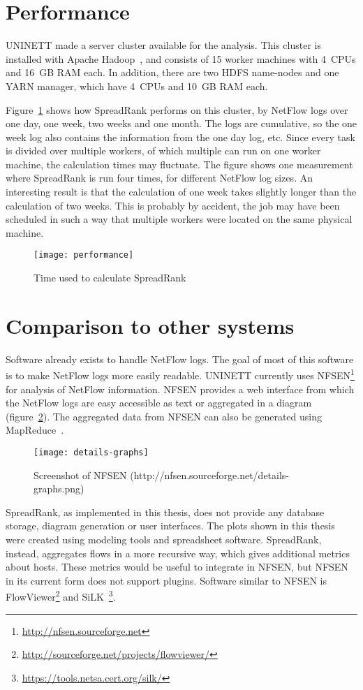 \section{Performance}
UNINETT made a server cluster available for the analysis.
This cluster is installed with Apache Hadoop~\cite{Borthakur:2011:AHG:1989323.1989438}, and consists of 15 worker machines with 4~CPUs and 16~GB RAM each.
In addition, there are two HDFS name-nodes and one YARN manager, which have 4~CPUs and 10~GB RAM each.

Figure~\ref{fig:performance} shows how SpreadRank performs on this cluster,
 by NetFlow logs over one day, one week, two weeks and one month.
The logs are cumulative, so the one week log also contains the information from the one day log, etc.
Since every task is divided over multiple workers, of which multiple can run on one worker machine,
 the calculation times may fluctuate.
The figure shows one measurement where SpreadRank is run four times, for different NetFlow log sizes.
An interesting result is that the calculation of one week takes slightly longer than the calculation of two weeks.
This is probably by accident, the job may have been scheduled in such a way that multiple workers were located on the same physical machine.

\begin{figure}[h]
	\caption{Time used to calculate SpreadRank}
	\label{fig:performance}
	\centering
		\texttt{[image: performance]}
\end{figure}


\section{Comparison to other systems}
Software already exists to handle NetFlow logs.
The goal of most of this software is to make NetFlow logs more easily readable.
UNINETT currently uses NFSEN\footnote{\url{http://nfsen.sourceforge.net}} for analysis of NetFlow information.
NFSEN provides a web interface from which the NetFlow logs are easy accessible as text or aggregated in a diagram (figure~\ref{fig:details-graphs}).
The aggregated data from NFSEN can also be generated using MapReduce~\cite{Morken352472}.

\begin{figure}[h]
	\caption{Screenshot of NFSEN (http://nfsen.sourceforge.net/details-graphs.png)}
	\label{fig:details-graphs}
	\centering
		\texttt{[image: details-graphs]}
\end{figure}

SpreadRank, as implemented in this thesis, does not provide any database storage, diagram generation or user interfaces.
The plots shown in this thesis were created using modeling tools and spreadsheet software.
SpreadRank, instead, aggregates flows in a more recursive way, which gives additional metrics about hosts.
These metrics would be useful to integrate in NFSEN, but NFSEN in its current form does not support plugins.
Software similar to NFSEN is FlowViewer\footnote{\url{http://sourceforge.net/projects/flowviewer/}} and SiLK~\footnote{\url{https://tools.netsa.cert.org/silk/}}.

